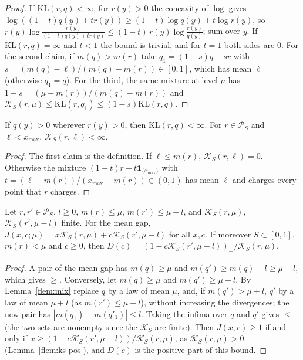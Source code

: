 \documentclass[11pt]{article}
\newcommand{\xmax}{x_{\max}}
\newcommand{\Simp}{\mathcal{P}_{S}}
\newcommand{\mean}{m}
\newcommand{\KL}{\mathrm{KL}}
\newcommand{\Ks}{\mathcal{K}_{S}}
\newcommand{\dirac}{\mathbf{1}_{\{x_{\max}\}}}
\begin{document}
\begin{proof}
If $\KL(r,q)<\infty$, for $r(y)>0$ the concavity of $\log$ gives
$\log((1-t)q(y)+tr(y))\ge(1-t)\log q(y)+t\log r(y)$, so
$r(y)\log\frac{r(y)}{(1-t)q(y)+tr(y)}\le(1-t)\,r(y)\log\frac{r(y)}{q(y)}$; sum over $y$. If
$\KL(r,q)=\infty$ and $t<1$ the bound is trivial, and for $t=1$ both sides are $0$. For the
second claim, if $\mean(q)>\mean(r)$ take $q_1=(1-s)q+sr$ with
$s=(\mean(q)-\ell)/(\mean(q)-\mean(r))\in[0,1]$, which has mean $\ell$ (otherwise $q_1=q$). For the
third, the same mixture at level $\mu$ has $1-s=(\mu-\mean(r))/(\mean(q)-\mean(r))$ and
$\Ks(r,\mu)\le\KL(r,q_1)\le(1-s)\KL(r,q)$.
\end{proof}

\begin{lemma}[$\Ks<\infty$ below $\xmax$]\label{flem:ks-finite}
If $q(y)>0$ wherever $r(y)>0$, then $\KL(r,q)<\infty$. For $r\in\Simp$ and $\ell<\xmax$,
$\Ks(r,\ell)<\infty$.
\end{lemma}

\begin{proof}
The first claim is the definition. If $\ell\le\mean(r)$, $\Ks(r,\ell)=0$. Otherwise the mixture
$(1-t)r+t\dirac$ with $t=(\ell-\mean(r))/(\xmax-\mean(r))\in(0,1)$ has mean $\ell$ and charges every
point that $r$ charges.
\end{proof}

\begin{lemma}\label{flem:programme-mean}
Let $r,r'\in\Simp$, $l\ge0$, $\mean(r)\le\mu$, $\mean(r')\le\mu+l$, and $\Ks(r,\mu)$, $\Ks(r',\mu-l)$
finite. For the mean gap, $J(x,c;\mu)=x\Ks(r,\mu)+c\Ks(r',\mu-l)$ for all $x,c$. If moreover
$S\subset[0,1]$, $\mean(r)<\mu$ and $c\ge0$, then $D(c)=(1-c\Ks(r',\mu-l))_+/\Ks(r,\mu)$.
\end{lemma}

\begin{proof}
A pair of the mean gap has $\mean(q)\ge\mu$ and $\mean(q')\ge\mean(q)-l\ge\mu-l$, which gives $\ge$.
Conversely, let $\mean(q)\ge\mu$ and $\mean(q')\ge\mu-l$. By Lemma~\ref{flem:mix} replace $q$ by a law
of mean $\mu$, and, if $\mean(q')>\mu+l$, $q'$ by a law of mean $\mu+l$ (as $\mean(r')\le\mu+l$),
without increasing the divergences; the new pair has $|\mean(q_1)-\mean(q'_1)|\le l$. Taking the
infima over $q$ and $q'$ gives $\le$ (the two sets are nonempty since the $\Ks$ are finite). Then
$J(x,c)\ge1$ if and only if $x\ge(1-c\Ks(r',\mu-l))/\Ks(r,\mu)$, as $\Ks(r,\mu)>0$
(Lemma~\ref{flem:ks-pos}), and $D(c)$ is the positive part of this bound.
\end{proof}
\end{document}
